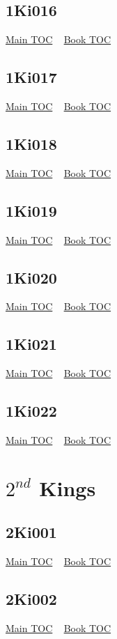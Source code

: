 \documentclass{book}
\begin{document}
  \section{1Ki016}\hyperlink{toc}{Main TOC} ~ \hyperref[subsec:1Ki]{Book TOC} 
  \section{1Ki017}\hyperlink{toc}{Main TOC} ~ \hyperref[subsec:1Ki]{Book TOC} 
  \section{1Ki018}\hyperlink{toc}{Main TOC} ~ \hyperref[subsec:1Ki]{Book TOC} 
  \section{1Ki019}\hyperlink{toc}{Main TOC} ~ \hyperref[subsec:1Ki]{Book TOC} 
  \section{1Ki020}\hyperlink{toc}{Main TOC} ~ \hyperref[subsec:1Ki]{Book TOC} 
  \section{1Ki021}\hyperlink{toc}{Main TOC} ~ \hyperref[subsec:1Ki]{Book TOC} 
  \section{1Ki022}\hyperlink{toc}{Main TOC} ~ \hyperref[subsec:1Ki]{Book TOC} 
  \chapter{$2^{nd}$ Kings} \label{subsec:2Ki} \begin{multicols}{2} \minitoc \end{multicols}
  \section{2Ki001}\hyperlink{toc}{Main TOC} ~ \hyperref[subsec:2Ki]{Book TOC} 
  \section{2Ki002}\hyperlink{toc}{Main TOC} ~ \hyperref[subsec:2Ki]{Book TOC} 
\end{document}
